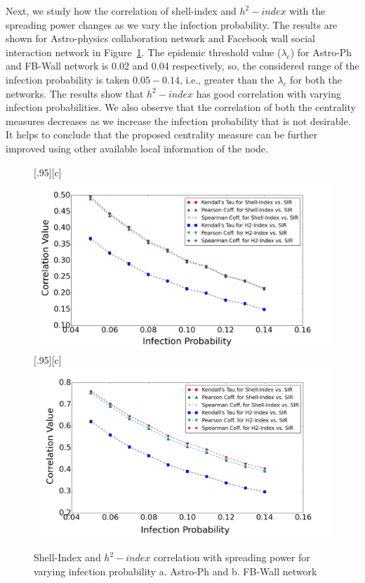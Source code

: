 \documentclass[12pt,3p]{article}
\begin{document}
Next, we study how the correlation of shell-index and $h^2-index$ with the spreading power changes as we vary the infection probability. The results are shown for Astro-physics collaboration network and Facebook wall social interaction network in Figure~\ref{fig2}. The epidemic threshold value ($\lambda_c$) for Astro-Ph and FB-Wall network is 0.02 and 0.04 respectively, so, the considered range of the infection probability is taken $0.05-0.14$, i.e., greater than the $\lambda_c$ for both the networks. The results show that $h^2-index$ has good correlation with varying infection probabilities. 
We also observe that the correlation of both the centrality measures decreases as we increase the infection probability that is not desirable. It helps to conclude that the proposed centrality measure can be further improved using other available local information of the node.

\begin{figure}[htp]
  \centering
  [.95\linewidth][c]{%
    \includegraphics[width=.95\linewidth]{images/astroph1.png}}\quad
  [.95\linewidth][c]{%
    \includegraphics[width=.95\linewidth]{images/fbwall1.png}}
  \caption{Shell-Index and $h^2-index$ correlation with spreading power for varying infection probability a. Astro-Ph and b. FB-Wall network}
  \label{fig2}
\end{figure}
\end{document}
